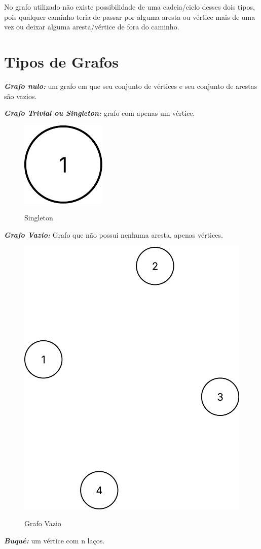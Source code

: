 	No grafo utilizado não existe possibilidade de uma cadeia/ciclo desses dois tipos, pois qualquer caminho teria de passar por alguma aresta ou vértice mais de uma vez ou deixar alguma aresta/vértice de fora do caminho.
	
	
	\section{Tipos de Grafos}\label{sec:tiposGrafos}
	\textit{\textbf{Grafo nulo:}} um grafo em que seu conjunto de vértices e seu conjunto de arestas são vazios. \par
	\textit{\textbf{Grafo Trivial ou Singleton:}} grafo com apenas um vértice.
	\begin{figure} [H]
		\centering
		\caption{Singleton}%
		\label{fig:singleton}%
		\includegraphics[width=0.1\linewidth,angle=0]{figuras/tiposgrafos/singleton.png}%
		\\
	\end{figure}
	\par
	\textit{\textbf{Grafo Vazio:}} Grafo que não possui nenhuma aresta, apenas vértices.
	\begin{figure} [H]
		\centering
		\caption{Grafo Vazio}%
		\label{fig:grafVazio}%
		\includegraphics[width=0.5\linewidth,angle=0]{figuras/tiposgrafos/grafVazio.png}%
		\\
	\end{figure}
	\textit{\textbf{Buquê:}} um vértice com n laços.
